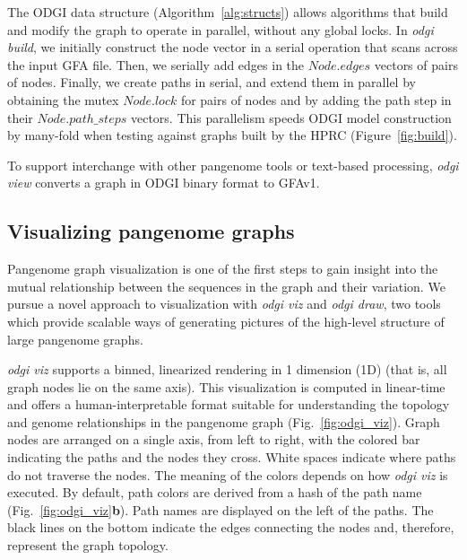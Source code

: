 \documentclass{bioinfo}
\begin{document}
The ODGI data structure (Algorithm~\ref{alg:structs}) allows algorithms that build and modify the graph to operate in parallel, without any global locks.
In \textit{odgi build}, we initially construct the node vector in a serial operation that scans across the input GFA file.
Then, we serially add edges in the $Node.edges$ vectors of pairs of nodes.
Finally, we create paths in serial, and extend them in parallel by obtaining the mutex $Node.lock$ for pairs of nodes and by adding the path step in their $Node.path\_steps$ vectors.
This parallelism speeds ODGI model construction by many-fold when testing against graphs built by the HPRC (Figure~\ref{fig:build}).

To support interchange with other pangenome tools or text-based processing, \textit{odgi view} converts a graph in ODGI binary format to GFAv1.



\subsection{Visualizing pangenome graphs}
\label{sec:viz}


Pangenome graph visualization is one of the first steps to gain insight into the mutual relationship between the sequences in the graph and their variation.
We pursue a novel approach to visualization with \textit{odgi viz} and \textit{odgi draw}, two tools which provide scalable ways of generating pictures of the high-level structure of large pangenome graphs.

\textit{odgi viz} supports a binned, linearized rendering in 1 dimension (1D) (that is, all graph nodes lie on the same axis).
This visualization is computed in linear-time and offers a human-interpretable format suitable for understanding the topology and genome relationships in the pangenome graph (Fig.~\ref{fig:odgi_viz}).
Graph nodes are arranged on a single axis, from left to right, with the colored bar indicating the paths and the nodes they cross.
White spaces indicate where paths do not traverse the nodes.
The meaning of the colors depends on how \textit{odgi viz} is executed.
By default, path colors are derived from a hash of the path name (Fig.~\ref{fig:odgi_viz}\textbf{b}).
Path names are displayed on the left of the paths.
The black lines on the bottom indicate the edges connecting the nodes and, therefore, represent the graph topology.
\end{document}
